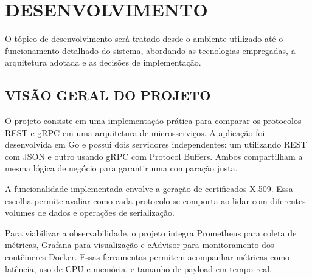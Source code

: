 \chapter{DESENVOLVIMENTO} \label{cap:desenvolvimento}

O tópico de desenvolvimento será tratado desde o ambiente utilizado até o funcionamento detalhado do sistema, abordando as tecnologias empregadas, a arquitetura adotada e as decisões de implementação.

\section{VISÃO GERAL DO PROJETO}\label{sec:visao}

O projeto consiste em uma implementação prática para comparar os protocolos REST e gRPC em uma arquitetura de microsserviços. A aplicação foi desenvolvida em Go e possui dois servidores independentes: um utilizando REST com JSON e outro usando gRPC com Protocol Buffers. Ambos compartilham a mesma lógica de negócio para garantir uma comparação justa.

A funcionalidade implementada envolve a geração de certificados X.509. Essa escolha permite avaliar como cada protocolo se comporta ao lidar com diferentes volumes de dados e operações de serialização.

Para viabilizar a observabilidade, o projeto integra Prometheus para coleta de métricas, Grafana para visualização e cAdvisor para monitoramento dos contêineres Docker. Essas ferramentas permitem acompanhar métricas como latência, uso de CPU e memória, e tamanho de payload em tempo real.




